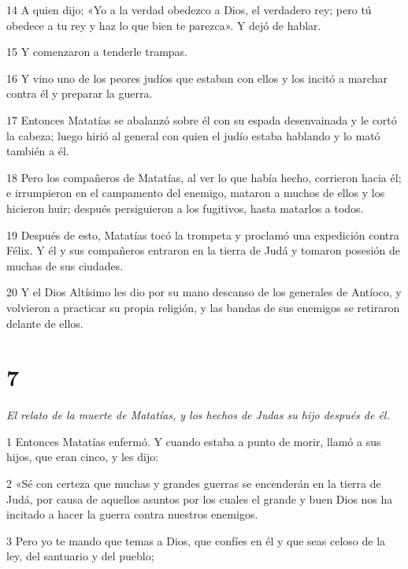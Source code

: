 \par 14 A quien dijo; «Yo a la verdad obedezco a Dios, el verdadero rey; pero tú obedece a tu rey y haz lo que bien te parezca». Y dejó de hablar.

\par 15 Y comenzaron a tenderle trampas.

\par 16 Y vino uno de los peores judíos que estaban con ellos y los incitó a marchar contra él y preparar la guerra.

\par 17 Entonces Matatías se abalanzó sobre él con su espada desenvainada y le cortó la cabeza; luego hirió al general con quien el judío estaba hablando y lo mató también a él.

\par 18 Pero los compañeros de Matatías, al ver lo que había hecho, corrieron hacia él; e irrumpieron en el campamento del enemigo, mataron a muchos de ellos y los hicieron huir; después persiguieron a los fugitivos, hasta matarlos a todos.

\par 19 Después de esto, Matatías tocó la trompeta y proclamó una expedición contra Félix. Y él y sus compañeros entraron en la tierra de Judá y tomaron posesión de muchas de sus ciudades.

\par 20 Y el Dios Altísimo les dio por su mano descanso de los generales de Antíoco, y volvieron a practicar su propia religión, y las bandas de sus enemigos se retiraron delante de ellos.

\chapter{7}

\par \textit{El relato de la muerte de Matatías, y los hechos de Judas su hijo después de él.}

\par 1 Entonces Matatías enfermó. Y cuando estaba a punto de morir, llamó a sus hijos, que eran cinco, y les dijo:

\par 2 «Sé con certeza que muchas y grandes guerras se encenderán en la tierra de Judá, por causa de aquellos asuntos por los cuales el grande y buen Dios nos ha incitado a hacer la guerra contra nuestros enemigos.

\par 3 Pero yo te mando que temas a Dios, que confíes en él y que seas celoso de la ley, del santuario y del pueblo;

